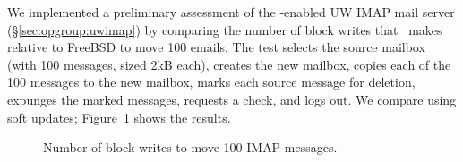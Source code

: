 \label{sec:evaluation:uwimap}
We implemented a preliminary assessment of the \opgroup-enabled UW IMAP mail server
(\S\ref{sec:opgroup:uwimap}) by comparing the number of block writes
that \Kudos\ makes relative to FreeBSD to move 100 emails. The test
selects the source mailbox (with 100 messages, sized 2kB each),
creates the new mailbox, copies each of the 100 messages to the new
mailbox, marks each source message for deletion, expunges the marked
messages, requests a check, and logs out. We compare using soft updates;
Figure~\ref{fig:imap-compare} shows the results.

\begin{figure}[t]
\caption{\label{fig:imap-compare} Number of block writes to move 100
  IMAP messages.}
\end{figure}
